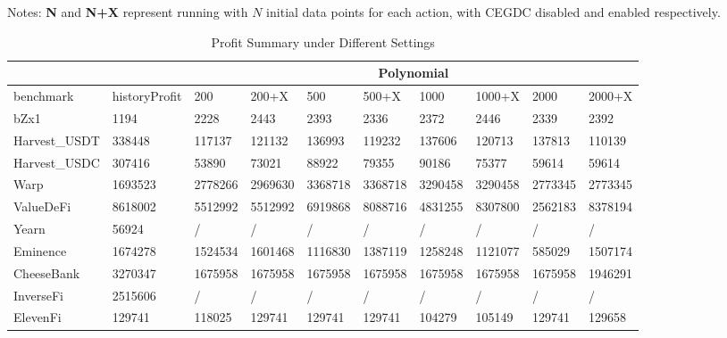 
\begin{table}[thbp]
    \caption{Profit Summary under Different Settings}

    {\raggedright Notes:
    \textbf{N} and \textbf{N+X} represent running {\name} with $N$ initial data points for each action, 
    with CEGDC disabled and enabled respectively.
    \par}

    \addtolength{\tabcolsep}{-2.5pt}
    \centering
    \scriptsize


\begin{tabular}{|l|l|llllllll|} 
    \hline
    \multicolumn{2}{|l|}{}                       & \multicolumn{8}{c|}{Polynomial}                                               \\ \hline
benchmark             & historyProfit           & 200     & 200+X   & 500     & 500+X   & 1000    & 1000+X  & 2000    & 2000+X   \\
bZx1                  & 1194                    & 2228    & 2443    & 2393    & 2336    & 2372    & 2446    & 2339    & 2392     \\
Harvest\_USDT         & 338448                  & 117137  & 121132  & 136993  & 119232  & 137606  & 120713  & 137813  & 110139   \\
Harvest\_USDC         & 307416                  & 53890   & 73021   & 88922   & 79355   & 90186   & 75377   & 59614   & 59614    \\
Warp                  & 1693523                 & 2778266 & 2969630 & 3368718 & 3368718 & 3290458 & 3290458 & 2773345 & 2773345  \\
ValueDeFi             & 8618002                 & 5512992 & 5512992 & 6919868 & 8088716 & 4831255 & 8307800 & 2562183 & 8378194  \\
Yearn                 & 56924                   & /       & /       & /       & /       & /       & /       & /       & /        \\
Eminence              & 1674278                 & 1524534 & 1601468 & 1116830 & 1387119 & 1258248 & 1121077 & 585029  & 1507174  \\
CheeseBank            & 3270347                 & 1675958 & 1675958 & 1675958 & 1675958 & 1675958 & 1675958 & 1675958 & 1946291  \\
InverseFi             & 2515606                 & /       & /       & /       & /       & /       & /       & /       & /        \\
ElevenFi              & 129741                  & 118025  & 129741  & 129741  & 129741  & 104279  & 105149  & 129741  & 129658   \\

\end{tabular}
\end{table}
